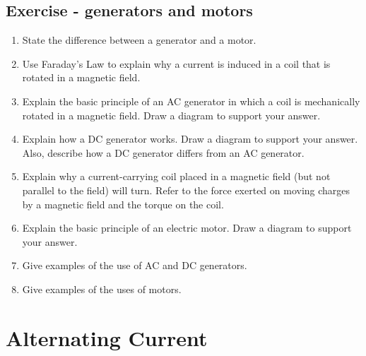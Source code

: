 \subsection {Exercise - generators and motors}
\begin{enumerate}
\item State the difference between a generator and a motor.
\item Use Faraday's Law to explain why a current is induced in a coil that is rotated in a magnetic field.
\item Explain the basic principle of an AC generator in which a coil is mechanically rotated in a magnetic field. Draw a diagram to support your answer.
\item  Explain how a DC generator works. Draw a diagram to support your answer. Also, describe how a DC generator differs from an AC generator.
\item  Explain why a current-carrying coil placed in a magnetic field (but not parallel to the field) will turn. Refer to the force exerted on moving charges by a magnetic field and the torque on the coil.
\item  Explain the basic principle of an electric motor. Draw a diagram to support your answer.
\item  Give examples of the use of AC and DC generators.
\item  Give examples of the uses of motors.
\end{enumerate}

\section{Alternating Current}

